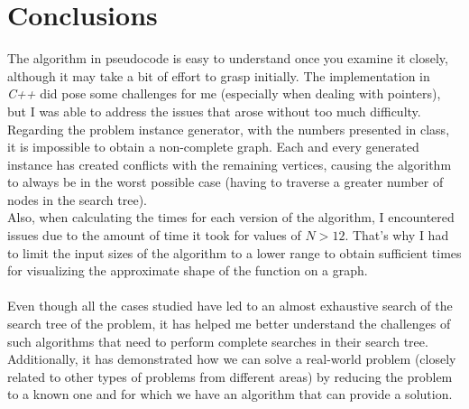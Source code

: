 \documentclass[british,a4paper,11pt,titlepage]{article}
\begin{document}
\section{Conclusions}
\label{sec:conclusions}
The algorithm in pseudocode is easy to understand once you examine it closely, although it may take a bit of effort to grasp initially. The implementation in \emph{C++} did pose some challenges for me (especially when dealing with pointers), but I was able to address the issues that arose without too much difficulty.
\\
Regarding the problem instance generator, with the numbers presented in class, it is impossible to obtain a non-complete graph. Each and every generated instance has created conflicts with the remaining vertices, causing the algorithm to always be in the worst possible case (having to traverse a greater number of nodes in the search tree).
\\
Also, when calculating the times for each version of the algorithm, I encountered issues due to the amount of time it took for values of $N>12$. That's why I had to limit the input sizes of the algorithm to a lower range to obtain sufficient times for visualizing the approximate shape of the function on a graph.
\\
\\
Even though all the cases studied have led to an almost exhaustive search of the search tree of the problem, it has helped me better understand the challenges of such algorithms that need to perform complete searches in their search tree. Additionally, it has demonstrated how we can solve a real-world problem (closely related to other types of problems from different areas) by reducing the problem to a known one and for which we have an algorithm that can provide a solution.

\clearpage







\end{document}

